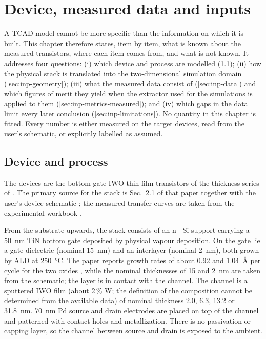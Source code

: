 \chapter{Device, measured data and inputs}\label{ch:device}

A TCAD model cannot be more specific than the information on which it is built. This chapter therefore states, item by
item, what is known about the measured transistors, where each item comes from, and what is not known. It addresses four
questions: (i) which device and process are modelled (\cref{sec:inp-device}); (ii) how the physical stack is translated
into the two-dimensional simulation domain (\cref{sec:inp-geometry}); (iii) what the measured data consist of
(\cref{sec:inp-data}) and which figures of merit they yield when the extractor used for the simulations is applied to
them (\cref{sec:inp-metrics-measured}); and (iv) which gaps in the data limit every later conclusion
(\cref{sec:inp-limitations}). No quantity in this chapter is fitted. Every number is either measured on the target
devices, read from the user's schematic, or explicitly labelled as assumed.

\section{Device and process}\label{sec:inp-device}

The devices are the bottom-gate IWO thin-film transistors of the thickness series of \citet{Januar2026}. The primary
source for the stack is Sec.~2.1 of that paper \citep[pp.~2--3]{Januar2026} together with the user's device schematic
\citep{DeviceSchematic}; the measured transfer curves are taken from the experimental workbook
\citep{ExperimentalWorkbook}.

From the substrate upwards, the stack consists of an n$^+$ Si support carrying a \SI{50}{nm} TiN bottom gate deposited
by physical vapour deposition. On the gate lie a \HfO{} gate dielectric (nominal \SI{15}{nm}) and an \AlO{} interlayer
(nominal \SI{2}{nm}), both grown by ALD at \SI{250}{\celsius}. The paper reports growth rates of about 0.92 and
\SI{1.04}{\angstrom} per cycle for the two oxides \citep[p.~2]{Januar2026}, while the nominal thicknesses of 15 and
\SI{2}{nm} are taken from the schematic; the \AlO{} layer is in contact with the channel. The channel is a sputtered IWO
film (about 2\,\% W; the definition of the composition cannot be determined from the available data) of nominal
thickness 2.0, 6.3, 13.2 or \SI{31.8}{nm}. \SI{70}{nm} Pd source and drain electrodes are placed on top of the channel
and patterned with contact holes and metallization. There is no passivation or capping layer, so the channel between
source and drain is exposed to the ambient.

